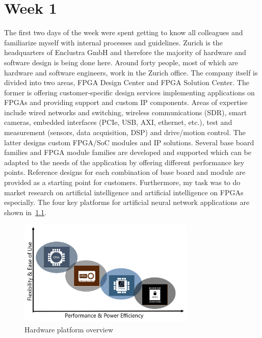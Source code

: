 %																
%																				 

\chapter{Week 1}
The first two days of the week were spent getting to know all colleagues and familiarize myself with internal processes and guidelines. Zurich is the headquarters of Enclustra GmbH and therefore the majority of hardware and software design is being done here. Around forty people, most of which are hardware and software engineers, work in the Zurich office. The company itself is divided into two areas, \ac{FPGA} Design Center and \ac{FPGA} Solution Center.
The former is offering customer-specific design services implementing applications on \acp{FPGA} and providing support and custom \ac{IP} components. Areas of expertise include wired networks and switching, wireless communications (\ac{SDR}), smart cameras, embedded interfaces (\ac{PCIe}, \ac{USB}, \ac{AXI}, ethernet, etc.), test and measurement (sensors, data acquisition, \ac{DSP}) and drive/motion control. 
The latter designs custom \ac{FPGA}/\ac{SoC} modules and \ac{IP} solutions. Several base board families and \ac{FPGA} module families are developed and supported which can be adapted to the needs of the application by offering different performance key points. Reference designs for each combination of base board and module are provided as a starting point for customers.
Furthermore, my task was to do market research on artificial intelligence and artificial intelligence on \acp{FPGA} especially. The four key platforms for artificial neural network applications are shown in~\ref{fig:overview}.
\begin{figure}[!htb]
	\centering
		\includegraphics[width=0.75\textwidth]{bilder/overview.png}
		\caption{Hardware platform overview}
		\label{fig:overview}
\end{figure}
